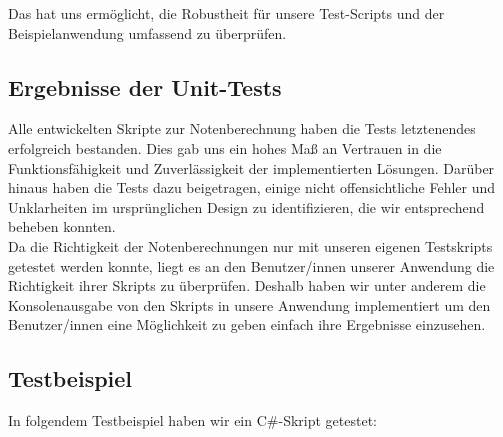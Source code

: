 Das hat uns ermöglicht, die Robustheit für unsere Test-Scripts  
und der Beispielanwendung umfassend zu überprüfen.

\newpage

\subsection*{Ergebnisse der Unit-Tests}
Alle entwickelten Skripte zur Notenberechnung haben die Tests letztenendes erfolgreich bestanden. 
Dies gab uns ein hohes Maß an Vertrauen in die Funktionsfähigkeit und Zuverlässigkeit der 
implementierten Lösungen. Darüber hinaus haben die Tests dazu beigetragen, einige nicht 
offensichtliche Fehler und Unklarheiten im ursprünglichen Design zu identifizieren, 
die wir entsprechend beheben konnten.\\

Da die Richtigkeit der Notenberechnungen nur mit unseren eigenen Testskripts getestet werden konnte,
liegt es an den Benutzer/innen unserer Anwendung die Richtigkeit ihrer Skripts zu überprüfen. Deshalb 
haben wir unter anderem die Konsolenausgabe von den Skripts in unsere Anwendung implementiert um den
Benutzer/innen eine Möglichkeit zu geben einfach ihre Ergebnisse einzusehen.

\newpage
\subsection*{Testbeispiel}

In folgendem Testbeispiel haben wir ein C\#-Skript getestet:

